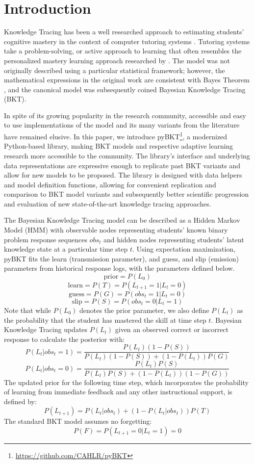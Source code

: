 \documentclass{edm_article}
\begin{document}

\section{Introduction}
Knowledge Tracing \cite{corbett1994knowledge} has been a well researched approach to estimating students' cognitive mastery in the context of computer tutoring systems \cite{pelanek2017bayesian}. Tutoring systems take a problem-solving, or active approach to learning \cite{anzai1979theory,aleven2002effective} that often resembles the personalized mastery learning approach researched by \citet{bloom19842}. The model was not originally described using a particular statistical framework; however, the mathematical expressions in the original work are consistent with Bayes Theorem \cite{reye2004student}, and the canonical model was subsequently coined Bayesian Knowledge Tracing (BKT). 

In spite of its growing popularity in the research community, accessible and easy to use implementations of the model and its many variants from the literature have remained elusive. In this paper, we introduce pyBKT\footnote{\url{https://github.com/CAHLR/pyBKT}}, a modernized Python-based library, making BKT models and respective adaptive learning research more accessible to the community. The library's interface and underlying data representations are expressive enough to replicate past BKT variants and allow for new models to be proposed. The library is designed with data helpers and model definition functions, allowing for convenient replication and comparison to BKT model variants and subsequently better scientific progression and evaluation of new state-of-the-art knowledge tracing approaches.

The Bayesian Knowledge Tracing model can be described as a Hidden Markov Model (HMM) with observable nodes representing students’ known binary problem response sequences $obs_t$ and hidden nodes representing students’ latent knowledge state at a particular time step $t$. Using expectation maximization, pyBKT fits the learn (transmission parameter), and guess, and slip (emission) parameters from historical response logs, with the parameters defined below.
$$
\text{prior} = P(L_0)
$$
$$
\text{learn} = P(T) = P(L_{t+1} = 1 | L_t = 0)
$$
$$
\text{guess} = P(G) = P(obs_t = 1 | L_t = 0)
$$
$$
\text{slip} = P(S) = P(obs_t = 0 | L_t = 1)
$$
Note that while $P(L_0)$ denotes the prior parameter, we also define $P(L_t)$ as the probability that the student has mastered the skill at time step $t$. Bayesian Knowledge Tracing updates $P(L_{t})$ given an observed correct or incorrect response to calculate the posterior with:
$$P(L_t | obs_t = 1) = \frac{P(L_t)(1-P(S))}{P(L_t)(1-P(S))+(1-P(L_t))P(G)}$$
$$P(L_t | obs_t = 0) = \frac{P(L_t)P(S)}{P(L_t)P(S)+(1-P(L_t))(1-P(G))}$$
The updated prior for the following time step, which incorporates the probability of learning from immediate feedback and any other instructional support, is defined by:
$$P(L_{t+1}) = P(L_t|obs_t) + (1-P(L_t|obs_t))P(T)$$
The standard BKT model assumes no forgetting: $$P(F) = P(L_{t+1} = 0 | L_t = 1) = 0$$
\end{document}
